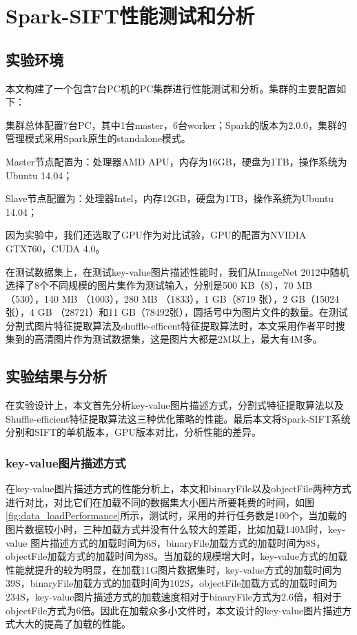 ﻿\chapter{Spark-SIFT性能测试和分析}
\section{实验环境}
本文构建了一个包含7台PC机的PC集群进行性能测试和分析。集群的主要配置如下：
\begin{compactenum}
\item 集群总体配置7台PC，其中1台master，6台worker；Spark的版本为2.0.0，集群的管理模式采用Spark原生的standalone模式。
\item Master节点配置为：处理器AMD APU，内存为16GB，硬盘为1TB，操作系统为Ubuntu 14.04；
\item Slave节点配置为：处理器Intel，内存12GB，硬盘为1TB，操作系统为Ubuntu 14.04；
\end{compactenum}

因为实验中，我们还选取了GPU作为对比试验，GPU的配置为NVIDIA GTX760，CUDA 4.0。

在测试数据集上，在测试key-value图片描述性能时，我们从ImageNet 2012中随机选择了8个不同规模的图片集作为测试输入，分别是500 KB（8），70 MB （530），140 MB （1003），280 MB （1833），1 GB（8719 张），2 GB（15024张），4 GB （28721）和11 GB（78492张），圆括号中为图片文件的数量。在测试分割式图片特征提取算法及shuffle-efficent特征提取算法时，本文采用作者平时搜集到的高清图片作为测试数据集，这是图片大都是2M以上，最大有4M多。
\section{实验结果与分析}
在实验设计上，本文首先分析key-value图片描述方式，分割式特征提取算法以及Shuffle-efficient特征提取算法这三种优化策略的性能。最后本文将Spark-SIFT系统分别和SIFT的单机版本，GPU版本对比，分析性能的差异。
\subsection{key-value图片描述方式}
在key-value图片描述方式的性能分析上，本文和binaryFile以及objectFile两种方式进行对比，对比它们在加载不同的数据集大小图片所要耗费的时间，如图\ref{fig:data_loadPerformance}所示，测试时，采用的并行任务数是100个，当加载的图片数据较小时，三种加载方式并没有什么较大的差距，比如加载140M时，key-value 图片描述方式的加载时间为6S，binaryFile加载方式的加载时间为8S，objectFile加载方式的加载时间为8S。当加载的规模增大时，key-value方式的加载性能就提升的较为明显，在加载11G图片数据集时，key-value方式的加载时间为39S，binaryFile加载方式的加载时间为102S，objectFile加载方式的加载时间为234S，key-value图片描述方式的加载速度相对于binaryFile方式为2.6倍，相对于objectFile方式为6倍。因此在加载众多小文件时，本文设计的key-value图片描述方式大大的提高了加载的性能。

